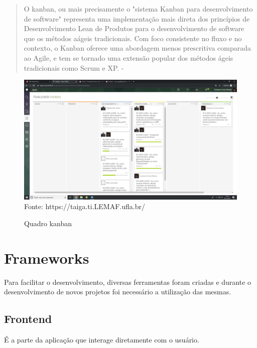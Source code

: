   \begin{quote}
    O kanban, ou mais precisamente o "sistema Kanban para desenvolvimento de software" representa uma implementação mais direta dos princípios de Desenvolvimento Lean de Produtos para o desenvolvimento de software que os métodos aágeis tradicionais. Com foco consistente no fluxo e no contexto, o Kanban oferece uma abordagem menos prescritiva comparada ao Agile, e tem se tornado uma extensão popular dos métodos ágeis tradicionais como Scrum e XP. - \cite{boeg2010kanban}
  \end{quote}
\begin{figure}[H]
\centering
\caption{Quadro kanban} %
\includegraphics[scale=0.2]{quadroKanban}\\  %
{\small Fonte: https://taiga.ti.LEMAF.ufla.br/} %
\label{fig:exemplo} %
\end{figure}

\section{Frameworks}

Para facilitar o desenvolvimento, diversas ferramentas foram criadas e durante o desenvolvimento de novos projetos foi necessário a utilização das mesmas.

\subsection{Frontend}

É a parte da aplicação que interage diretamente com o usuário.

